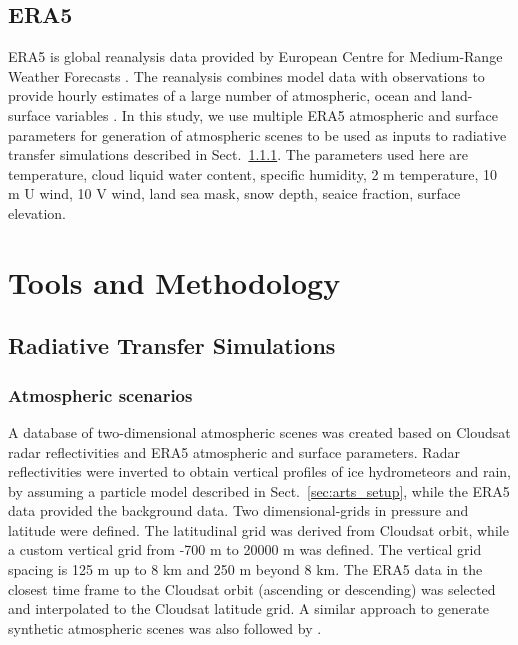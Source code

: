 \documentclass[amt, manuscript]{copernicus}
\begin{document}
\subsection{ERA5}
%
\label{sec:era5}
ERA5 is global reanalysis data provided by European Centre for Medium-Range Weather Forecasts  \citep[ECMWF,][]{era5:18}. The reanalysis combines model data with observations to provide hourly estimates of a large number of atmospheric, ocean and land-surface variables . In this study, we use multiple ERA5 atmospheric and surface parameters for generation of atmospheric scenes to be used as inputs to radiative transfer simulations described in Sect.~\ref{sec:atm_scenes}. The parameters used here are temperature, cloud liquid water content, specific humidity, 2\,\,m temperature, 10\,\,m U wind, 10\,\,V wind, land sea mask, snow depth, seaice fraction, surface elevation. 

\section{Tools and Methodology}

\subsection{Radiative Transfer Simulations}
\label{sec:rt_simulations}

\subsubsection{Atmospheric scenarios}
\label{sec:atm_scenes}

A database of two-dimensional atmospheric scenes was created based on Cloudsat radar reflectivities and ERA5 atmospheric and surface parameters. Radar reflectivities were inverted to obtain vertical profiles of ice hydrometeors and rain, by assuming a particle model described in Sect.~\ref{sec:arts_setup}, while the ERA5 data provided the background data. Two dimensional-grids in pressure and latitude were defined. The latitudinal grid was derived from Cloudsat orbit, while a custom vertical grid from -700\,\,m to 20000\,\,m was defined. The vertical grid spacing is 125\,\,m up to 8\,\,km and 250\,\,m beyond 8\,\,km. The ERA5 data in the closest time frame to the Cloudsat orbit (ascending or descending) was selected and interpolated to the Cloudsat latitude grid. A similar approach to generate synthetic atmospheric scenes was also followed by \citet{ekelund2020using}.  
\end{document}
